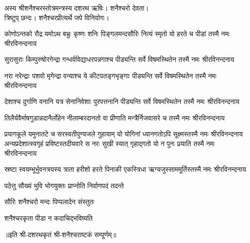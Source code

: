 

अस्य श्रीशनैश्चरस्तोत्रमन्त्रस्य दशरथ ऋषिः। शनैश्चरो देवता।\\
त्रिष्टुप् छन्दः। शनैश्चरप्रीत्यर्थे जपे विनियोगः।


\twolineshloka
{कोणोऽन्तको रौद्र यमोऽथ बभ्रुः कृष्णः शनिः पिङ्गलमन्दसौरिः}
{नित्यं स्मृतो यो हरते च पीडां तस्मै नमः श्रीरविनन्दनाय}

\twolineshloka
{सुरासुराः किम्पुरुषोरगेन्द्रा गन्धर्वविद्याधरपन्नगाश्च}
{पीड्यन्ति सर्वे विषमस्थितेन तस्मै नमः श्रीरविनन्दनाय}

\twolineshloka
{नरा नरेन्द्राः पशवो मृगेन्द्रा वन्याश्च ये कीटपतङ्गभृङ्गाः}
{पीड्यन्ति सर्वे विषमस्थितेन तस्मै नमः श्रीरविनन्दनाय}

\twolineshloka
{देशाश्च दुर्गाणि वनानि यत्र सेनानिवेशाः पुरपत्तनानि}
{पीड्यन्ति सर्वे विषमस्थितेन तस्मै नमः श्रीरविनन्दनाय}

\twolineshloka
{तिलैर्यवैर्माषगुडान्नदानैर्लोहेन नीलाम्बरदानतो वा}
{प्रीणाति मन्त्रैर्निजवासरे च तस्मै नमः श्रीरविनन्दनाय}

\twolineshloka
{प्रयागकूले यमुनातटे च सरस्वतीपुण्यजले गुहायाम्}
{यो योगिनां ध्यानगतोऽपि सूक्ष्मस्तस्मै नमः श्रीरविनन्दनाय}
\twolineshloka
{अन्यप्रदेशात्स्वगृहं प्रविष्टस्तदीयवारे स नरः सुखी स्यात्}
{गृहाद्गतो यो न पुनः प्रयाति तस्मै नमः श्रीरविनन्दनाय}

\twolineshloka
{स्रष्टा स्वयम्भूर्भुवनत्रयस्य त्राता हरीशो हरते पिनाकी}
{एकस्त्रिधा ऋग्यजुस्साममूर्तिस्तस्मै नमः श्रीरविनन्दनाय}

{पठेत्तु सौख्यं भुवि भोगयुक्तः प्राप्नोति निर्वाणपदं तदन्ते}

{सौरिः शनैश्चरो मन्दः पिप्पलादेन संस्तुतः}

{शनैश्चरकृता पीडा न कदाचिद्भविष्यति}

॥इति श्री-दशरथकृतं श्री-शनैश्चराष्टकं सम्पूर्णम्॥

